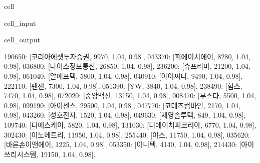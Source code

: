 \documentclass[letterpaper,10pt,english]{jupyterBook}
\begin{document}
\begin{sphinxuseclass}{cell}\begin{sphinxVerbatimInput}

\begin{sphinxuseclass}{cell_input}
\begin{sphinxVerbatim}[commandchars=\\\{\}]
\end{sphinxVerbatim}

\end{sphinxuseclass}\end{sphinxVerbatimInput}
\begin{sphinxVerbatimOutput}

\begin{sphinxuseclass}{cell_output}
\begin{sphinxVerbatim}[commandchars=\\\{\}]
\PYGZob{}\PYGZsq{}190650\PYGZsq{}: [\PYGZsq{}코리아에셋투자증권\PYGZsq{}, 9970, 1.04, 0.98],
 \PYGZsq{}043370\PYGZsq{}: [\PYGZsq{}피에이치에이\PYGZsq{}, 8280, 1.04, 0.98],
 \PYGZsq{}036800\PYGZsq{}: [\PYGZsq{}나이스정보통신\PYGZsq{}, 26850, 1.04, 0.98],
 \PYGZsq{}236200\PYGZsq{}: [\PYGZsq{}슈프리마\PYGZsq{}, 21200, 1.04, 0.98],
 \PYGZsq{}061040\PYGZsq{}: [\PYGZsq{}알에프텍\PYGZsq{}, 5800, 1.04, 0.98],
 \PYGZsq{}040910\PYGZsq{}: [\PYGZsq{}아이씨디\PYGZsq{}, 9490, 1.04, 0.98],
 \PYGZsq{}222110\PYGZsq{}: [\PYGZsq{}팬젠\PYGZsq{}, 7300, 1.04, 0.98],
 \PYGZsq{}051390\PYGZsq{}: [\PYGZsq{}YW\PYGZsq{}, 3840, 1.04, 0.98],
 \PYGZsq{}238490\PYGZsq{}: [\PYGZsq{}힘스\PYGZsq{}, 7470, 1.04, 0.98],
 \PYGZsq{}072020\PYGZsq{}: [\PYGZsq{}중앙백신\PYGZsq{}, 13150, 1.04, 0.98],
 \PYGZsq{}008470\PYGZsq{}: [\PYGZsq{}부스타\PYGZsq{}, 5500, 1.04, 0.98],
 \PYGZsq{}099190\PYGZsq{}: [\PYGZsq{}아이센스\PYGZsq{}, 29500, 1.04, 0.98],
 \PYGZsq{}047770\PYGZsq{}: [\PYGZsq{}코데즈컴바인\PYGZsq{}, 2170, 1.04, 0.98],
 \PYGZsq{}043260\PYGZsq{}: [\PYGZsq{}성호전자\PYGZsq{}, 1520, 1.04, 0.98],
 \PYGZsq{}049630\PYGZsq{}: [\PYGZsq{}재영솔루텍\PYGZsq{}, 849, 1.04, 0.98],
 \PYGZsq{}109740\PYGZsq{}: [\PYGZsq{}디에스케이\PYGZsq{}, 5820, 1.04, 0.98],
 \PYGZsq{}131030\PYGZsq{}: [\PYGZsq{}디에이치피코리아\PYGZsq{}, 6770, 1.04, 0.98],
 \PYGZsq{}302430\PYGZsq{}: [\PYGZsq{}이노메트리\PYGZsq{}, 11950, 1.04, 0.98],
 \PYGZsq{}255440\PYGZsq{}: [\PYGZsq{}야스\PYGZsq{}, 11750, 1.04, 0.98],
 \PYGZsq{}035620\PYGZsq{}: [\PYGZsq{}바른손이앤에이\PYGZsq{}, 1225, 1.04, 0.98],
 \PYGZsq{}053350\PYGZsq{}: [\PYGZsq{}이니텍\PYGZsq{}, 4140, 1.04, 0.98],
 \PYGZsq{}214430\PYGZsq{}: [\PYGZsq{}아이쓰리시스템\PYGZsq{}, 19150, 1.04, 0.98],

\end{sphinxVerbatim}
\end{sphinxuseclass}
\end{sphinxVerbatimOutput}
\end{sphinxuseclass}
\end{document}
